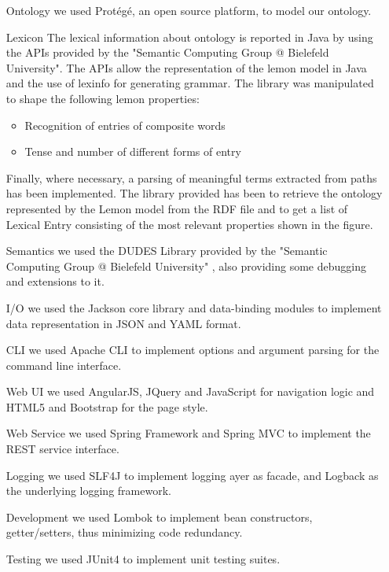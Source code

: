 \begin{itemize}
	\item[Ontology] we used Protégé, an open source platform, to model our ontology.
	
	\item[Lexicon] The lexical information about ontology is reported in Java by using the APIs provided by the "Semantic Computing Group @ Bielefeld University". The APIs allow the representation of the lemon model in Java and the use of lexinfo for generating grammar. The library was manipulated to shape the following lemon properties: 
	\begin{itemize}
		\item Recognition of entries of composite words
		\item Tense and number of different forms of entry 
	\end{itemize}	

	Finally, where necessary, a parsing of meaningful terms extracted from paths has been implemented.
	The library provided has been to retrieve the ontology represented by the Lemon model from the RDF file and to get a list of Lexical Entry consisting of the most relevant properties shown in the figure.
	
	\item[Semantics] we used the DUDES Library provided by the "Semantic Computing Group @ Bielefeld University" \cite{dudesLibrary}, also providing some debugging and extensions to it.

	\item[I/O] we used the Jackson core library and data-binding modules to implement data representation in JSON and YAML format.
	
	\item[CLI] we used Apache CLI to implement options and argument parsing for the command line interface.
	
	\item[Web UI] we used AngularJS, JQuery and JavaScript for navigation logic and HTML5 and Bootstrap for the page style.
	
	\item[Web Service] we used Spring Framework and Spring MVC to implement the REST service interface.
	
	\item[Logging] we used SLF4J to implement logging ayer as facade, and Logback as the underlying logging framework.
	
	\item[Development] we used Lombok to implement bean constructors, getter/setters, thus minimizing code redundancy.
	
	\item[Testing] we used JUnit4 to implement unit testing suites.
\end{itemize}

